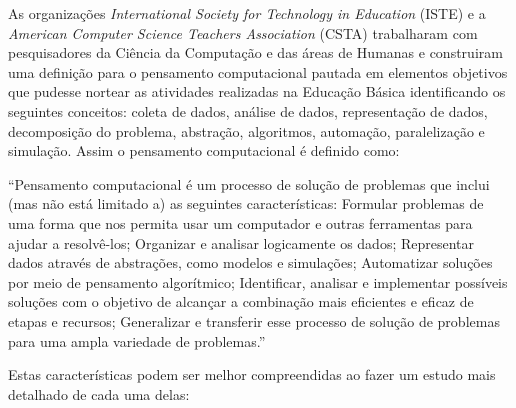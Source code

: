 \documentclass[12pt, openright, a4paper, brazil, english, french, spanish, bibjustif, openany, oneside]{abntex2}
\begin{document}
As organizações \textit{International Society for Technology in Education} (ISTE) e a \textit{American Computer Science Teachers Association} (CSTA) trabalharam com pesquisadores da Ciência da Computação e das áreas de Humanas e construiram uma definição para o pensamento computacional pautada em elementos objetivos que pudesse nortear as atividades realizadas na Educação Básica identificando os seguintes conceitos: coleta de dados, análise de dados, representação de dados, decomposição do problema, abstração, algoritmos, automação, paralelização e simulação. Assim o pensamento computacional é definido como:

\begin{citacao}

``Pensamento computacional é um processo de solução de problemas que inclui (mas não está limitado a) as seguintes características: Formular problemas de uma forma que nos permita usar um computador e outras ferramentas para ajudar a resolvê-los; Organizar e analisar logicamente os dados; Representar dados através de abstrações, como modelos e simulações; Automatizar soluções por meio de pensamento algorítmico; Identificar, analisar e implementar possíveis soluções com o objetivo de alcançar a combinação mais eficientes e eficaz de etapas e recursos; Generalizar e transferir esse processo de solução de problemas para uma ampla variedade de problemas.''\cite{iste/csta}

\end{citacao}

Estas características podem ser melhor compreendidas ao fazer um estudo mais detalhado de cada uma delas:
\end{document}
